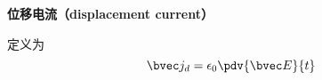 
\begin{issues}
\issueDraft
\end{issues}

\textbf{位移电流（displacement current）}

定义为
\begin{equation}
\bvec j_d = \epsilon_0 \pdv{\bvec E}{t}
\end{equation}
